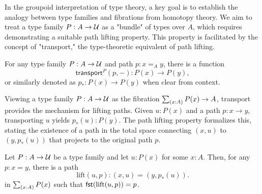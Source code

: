\documentclass[main.tex]{subfiles}
\begin{document}
In the groupoid interpretation of type theory, a key goal is to establish the analogy between type families and fibrations from homotopy theory. We aim to treat a type family $P : A \to \mathcal{U}$ as a "bundle" of types over $A$, which requires demonstrating a suitable path lifting property. This property is facilitated by the concept of "transport," the type-theoretic equivalent of path lifting.
\begin{lemma}
    For any type family $P : A \to \mathcal{U}$ and path $p : x =_A y$, there is a function 
    \[\mathsf{transport}^P(p, -) : P(x) \to P(y),\]
    or similarly denoted as $p_* : P(x) \to P(y)$ when clear from context.
\end{lemma}
Viewing a type family $P : A \to \mathcal{U}$ as the fibration $\sm{x : A}P(x) \to A$, transport provides the mechanism for lifting paths. Given $u : P(x)$ and a path $p : x \to y$, transporting $u$ yields $p_*(u) : P(y)$. The path lifting property formalizes this, stating the existence of a path in the total space connecting $(x,u)$ to $(y, p_*(u))$ that projects to the original path $p$.

\begin{lemma}
    Let $P : A \to \mathcal{U}$ be a type family and let $u : P(x)$ for some $x : A$. Then, for any $p : x = y$, there is a path
    $$\text{lift}(u,p) : (x,u) = (y, p_*(u)).$$
    in $\sm{x : A}P(x)$ such that $\mathsf{fst}(\text{lift}(u,p)) = p$.
\end{lemma}
\end{document}
